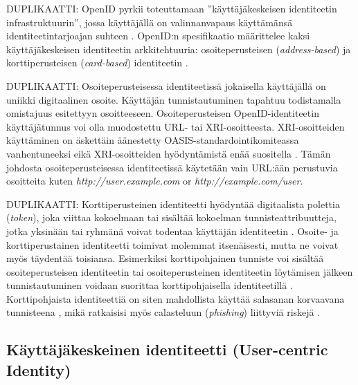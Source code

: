 \documentclass[english,gradu]{tktltiki}
\begin{document}
              DUPLIKAATTI:
OpenID pyrkii toteuttamaan ''käyttäjäkeskeisen identiteetin infrastruktuurin'', jossa käyttäjällä on valinnanvapaus käyttämänsä identiteetintarjoajan suhteen \cite{openid_2.0_platform_2009}. OpenID:n spesifikaatio määrittelee kaksi käyttäjäkeskeisen identiteetin arkkitehtuuria: osoiteperusteisen (\emph{address-based}) ja korttiperusteisen (\emph{card-based}) identiteetin \cite{openid_2.0_specification_07}.

              DUPLIKAATTI:
Osoiteperusteisessa identiteetissä jokaisella käyttäjällä on uniikki digitaalinen osoite. Käyttäjän tunnistautuminen tapahtuu todistamalla omistajuus esitettyyn osoitteeseen. Osoiteperusteisen OpenID-identiteetin käyttäjätunnus voi olla muodostettu URL- tai XRI-osoitteesta. XRI-osoitteiden käyttäminen on äskettäin äänestetty OASIS-standardointikomiteassa vanhentuneeksi eikä XRI-osoitteiden hyödyntämistä enää suositella \cite{xri_depcrecated_08a, xri_depcrecated_08b, xri_depcrecated_08c, xri_depcrecated_08d}. Tämän johdosta osoiteperusteisessa identiteetissä käytetään vain URL:ään perustuvia osoitteita kuten \emph{http://user.example.com} or \emph{http://example.com/user}.

              DUPLIKAATTI:
Korttiperusteinen identiteetti hyödyntää digitaalista polettia (\emph{token}), joka viittaa kokoelmaan tai sisältää kokoelman tunnisteattribuutteja, jotka yksinään tai ryhmänä voivat todentaa käyttäjän identiteetin \cite{openid_2.0_platform_2009}. Osoite- ja korttiperustainen identiteetti toimivat molemmat itsenäisesti, mutta ne voivat myös täydentää toisiansa. Esimerkiksi korttipohjainen tunniste voi sisältää osoiteperusteisen identiteetin tai osoiteperusteinen identiteetin löytämisen jälkeen tunnistautuminen voidaan suorittaa korttipohjaisella identiteetillä \cite{openid_2.0_platform_2009}. Korttipohjaista identiteettiä on siten mahdollista käyttää salasanan korvaavana tunnisteena \cite{infocards_09}, mikä ratkaisisi myös calasteluun (\emph{phishing}) liittyviä riskejä \cite{cameron_infocard_07}.




\subsection{Käyttäjäkeskeinen identiteetti (User-centric Identity)} %
\label{sub:käyttäjäkeskeinen_identiteetti_user_centric_identity_}
\end{document}
